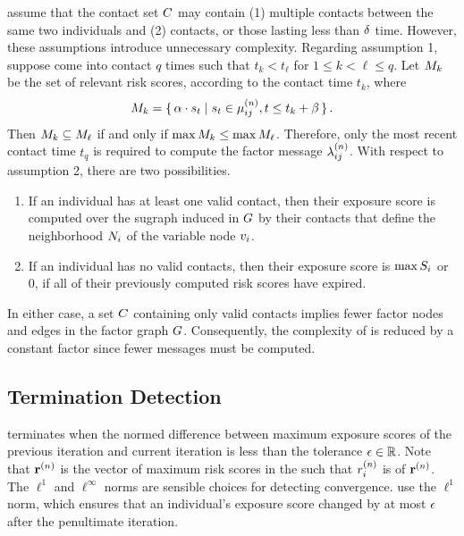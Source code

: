 \citet{Ayday2021} assume that the contact set $C$ may contain (1) multiple contacts between the same two individuals and (2)  contacts, or those lasting less than $\delta$ time. However, these assumptions introduce unnecessary complexity. Regarding assumption 1, suppose  come into contact $q$ times such that $t_k < t_\ell$ for $1 \leq k < \ell \leq q$. Let $M_k$ be the set of relevant risk scores, according to the contact time $t_k$, where
%
\begin{equation*}
  M_k = \set{ \alpha\cdot s_t | s_t \in \mu_{ij}^{(n)}, t \leq t_k + \beta}.
\end{equation*}
%
Then $M_k \subseteq M_\ell$ if and only if $\max M_k \leq \max M_\ell$. Therefore, only the most recent contact time $t_q$ is required to compute the factor message $\lambda_{ij}^{(n)}$. With respect to assumption 2, there are two possibilities.
%
\begin{enumerate}
  \item If an individual has at least one valid contact, then their exposure score is computed over the sugraph induced in $G$ by their contacts that define the neighborhood $N_i$ of the variable node $\vVariable_i$.
  \item If an individual has no valid contacts, then their exposure score is $\max S_i$ or $0$, if all of their previously computed risk scores have expired.
\end{enumerate}
%
In either case, a set $C$ containing only valid contacts implies fewer factor nodes and edges in the factor graph $G$. Consequently, the complexity of \cSyncRiskProp{} is reduced by a constant factor since fewer messages must be computed.

\subsection{Termination Detection}

\cSyncRiskProp{} terminates when the normed difference between maximum exposure scores of the previous iteration and current iteration is less than the tolerance $\epsilon \in \mathbb{R}$. Note that $\vIndexedMaxExpScores{n}$ is the vector of maximum risk scores in the  such that $\vIndexedMaxExpScores[i]{n}$ is  of $\vIndexedMaxExpScores{n}$. The $\ell^1$ and $\ell^\infty$ norms are sensible choices for detecting convergence. \citet{Ayday2021} use the $\ell^1$ norm, which ensures that an individual's exposure score changed by at most $\epsilon$ after the penultimate iteration.

